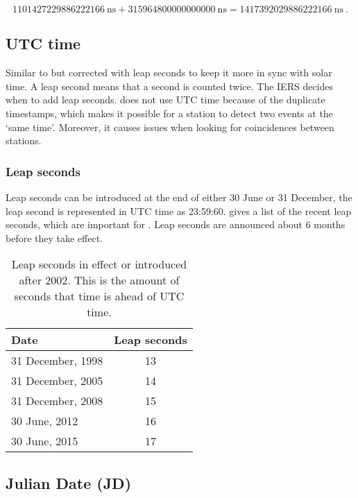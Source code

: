 \begin{equation}
    \SI{1101427229886222166}{\nano\second} +
        \SI{315964800000000000}{\nano\second} =
        \SI{1417392029886222166}{\nano\second} \ .
\end{equation}


\subsection{UTC time}

Similar to \gps but corrected with leap seconds to keep it more in sync
with solar time. A leap second means that a second is counted twice. The
IERS decides when to add leap seconds. \hisparc does not use UTC time
because of the duplicate timestamps, which makes it possible for a
station to detect two events at the `same time'. Moreover, it causes
issues when looking for coincidences between stations.


\subsubsection{Leap seconds}

Leap seconds can be introduced at the end of either 30 June or 31
December, the leap second is represented in UTC time as 23:59:60.
 gives a list of the recent leap seconds,
which are important for \hisparc. Leap seconds are announced about 6
months before they take effect.

\begin{table}
    \centering
    \begin{tabular}{ l c }
        \toprule
        Date & Leap seconds \\
        \midrule
        31 December, 1998 & 13 \\
        31 December, 2005 & 14 \\
        31 December, 2008 & 15 \\
        30 June, 2012 & 16 \\
        30 June, 2015 & 17 \\
        \bottomrule
    \end{tabular}
   \caption{Leap seconds in effect or introduced after 2002. This is the
            amount of seconds that \gps time is ahead of UTC time.}
   \label{table:leapseconds}
\end{table}


\subsection{Julian Date (JD)}

